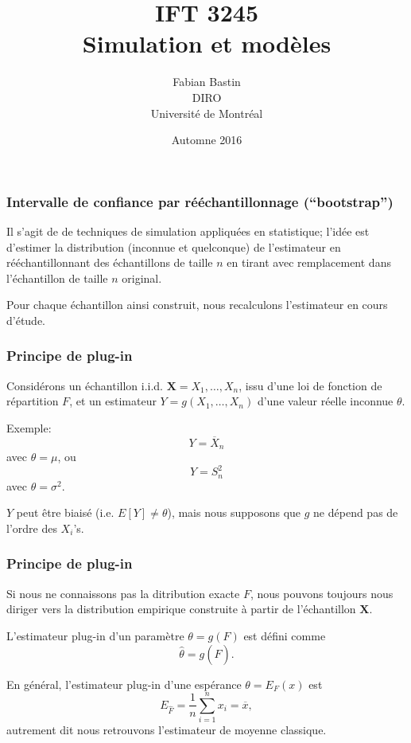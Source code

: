 \documentclass[t,usepdftitle=false]{beamer}
\title[IFT3245]{IFT 3245\\Simulation et modèles}
\author[Fabian Bastin]{Fabian Bastin\\DIRO\\Université de Montréal}
\date{Automne 2016}
\def\bX{\boldsymbol{X}}
\begin{document}
\frame{\titlepage}

\begin{frame}
\frametitle{Intervalle de confiance par rééchantillonnage (``bootstrap'')}

Il s'agit de de techniques de simulation appliquées en statistique;
l'idée est d'estimer la distribution (inconnue et quelconque) de
l'estimateur en rééchantillonnant des échantillons de taille ${n}$ en
tirant avec remplacement dans l'échantillon de taille ${n}$ original.

\mbox{}

Pour chaque échantillon ainsi construit, nous recalculons l'estimateur
en cours d'étude.

\end{frame}

\begin{frame}
\frametitle{Principe de plug-in}

Considérons un échantillon i.i.d. $\bX = X_1,\dots,X_n$, issu d'une loi de
fonction de répartition ${F}$, et un estimateur ${Y} =
{g}(X_1,\dots,X_n)$ d'une valeur réelle inconnue ${\theta}$.

\mbox{}

Exemple:
\[
Y = \overline{X}_n
\]
avec $\theta=\mu$, ou
\[
Y = S_n^2\]
avec
$\theta = \sigma^2$.

\mbox{}

$Y$ peut être biaisé (i.e. $E[Y] \not= \theta$), mais nous supposons
que $g$ ne dépend pas de l'ordre des $X_i$'s.

\end{frame}

\begin{frame}
\frametitle{Principe de plug-in}

Si nous ne connaissons pas la ditribution exacte $F$, nous pouvons
toujours nous diriger vers la distribution empirique
construite à partir de l'échantillon
$\bX$.

\mbox{}

L'estimateur plug-in d'un paramètre $\theta = g(F)$ est défini comme
\[
\hat{\theta} = g(\hat{F}).
\]

\mbox{}

En général, l'estimateur plug-in d'une espérance $\theta = E_F(x)$ est
\[
E_{\hat{F}} = \frac{1}{n} \sum_{i = 1}^n x_i = \overline{x},
\]
autrement dit nous retrouvons l'estimateur de moyenne classique.

\end{frame}
\end{document}

